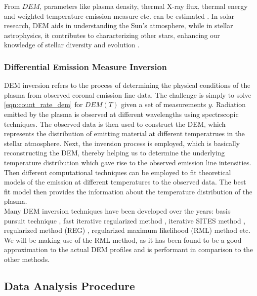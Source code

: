 \noindent From $DEM$, parameters like plasma density, thermal X-ray flux, thermal energy and weighted temperature emission measure etc. can be estimated \citep{Su2018-fq}. In solar research, DEM aids in understanding the Sun's atmosphere, while in stellar astrophysics, it contributes to characterizing other stars, enhancing our knowledge of stellar diversity and evolution \citep{Namekata2023-rq}.

\subsubsection{Differential Emission Measure Inversion}

DEM inversion refers to the process of determining the physical conditions of the plasma from observed coronal emission line data. The challenge is simply to solve \cref{eqn:count_rate_dem} for $DEM(T)$ given a set of measurements $y$. Radiation emitted by the plasma is observed at different wavelengths using spectrscopic techniques. The observed data is then used to construct the DEM, which represents the distribution of emitting material at different temperatrues in the stellar atmosphere. Next, the inversion process is employed, which is basically reconstructing the DEM, thereby helping us to determine the underlying temperature distribution which gave rise to the observed emission line intensities. Then different computational techniques can be employed to fit theoretical models of the emission at different temperatures to the observed data. The best fit model then provides the information about the temperature distribution of the plasma.\\

Many DEM inversion techniques have been developed over the years: basis pursuit technique \citep{Cheung2015}, fast iterative regularized method \citep{Plowman2013}, iterative SITES method \citep{Morgan2019}, regularized method (REG) \citep{Hannah2012}, regularized maximum likelihood (RML) method \citep{Massa2023} etc. We will be making use of the RML method, as it has been found to be a good approximation to the actual DEM profiles and is performant in comparison to the other methods.

\subsection{Data Analysis Procedure}
\label{sec:data_analysis_procedure}

